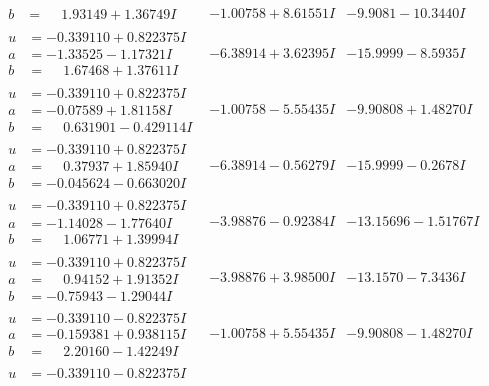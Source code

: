 \documentclass[1p]{elsarticle_modified}
\theoremstyle{definition}
\begin{document}
$$\begin{array}{c|c|c}
\begin{aligned}
b &= \phantom{-}1.93149 + 1.36749 I\end{aligned}
 & -1.00758 + 8.61551 I & -9.9081 - 10.3440 I \\ \hline\begin{aligned}
u &= -0.339110 + 0.822375 I \\
a &= -1.33525 - 1.17321 I \\
b &= \phantom{-}1.67468 + 1.37611 I\end{aligned}
 & -6.38914 + 3.62395 I & -15.9999 - 8.5935 I \\ \hline\begin{aligned}
u &= -0.339110 + 0.822375 I \\
a &= -0.07589 + 1.81158 I \\
b &= \phantom{-}0.631901 - 0.429114 I\end{aligned}
 & -1.00758 - 5.55435 I & -9.90808 + 1.48270 I \\ \hline\begin{aligned}
u &= -0.339110 + 0.822375 I \\
a &= \phantom{-}0.37937 + 1.85940 I \\
b &= -0.045624 - 0.663020 I\end{aligned}
 & -6.38914 - 0.56279 I & -15.9999 - 0.2678 I \\ \hline\begin{aligned}
u &= -0.339110 + 0.822375 I \\
a &= -1.14028 - 1.77640 I \\
b &= \phantom{-}1.06771 + 1.39994 I\end{aligned}
 & -3.98876 - 0.92384 I & -13.15696 - 1.51767 I \\ \hline\begin{aligned}
u &= -0.339110 + 0.822375 I \\
a &= \phantom{-}0.94152 + 1.91352 I \\
b &= -0.75943 - 1.29044 I\end{aligned}
 & -3.98876 + 3.98500 I & -13.1570 - 7.3436 I \\ \hline\begin{aligned}
u &= -0.339110 - 0.822375 I \\
a &= -0.159381 + 0.938115 I \\
b &= \phantom{-}2.20160 - 1.42249 I\end{aligned}
 & -1.00758 + 5.55435 I & -9.90808 - 1.48270 I \\ \hline\begin{aligned}
u &= -0.339110 - 0.822375 I \\

\end{aligned}
\end{array}$$
\end{document}
